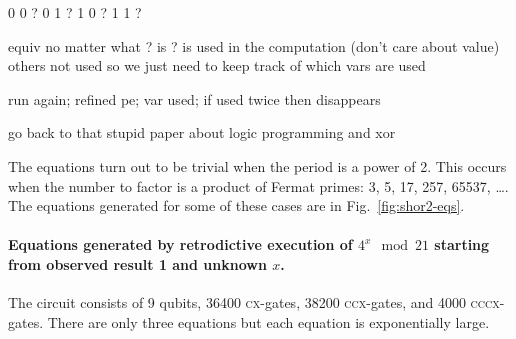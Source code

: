 \documentclass{article}
\newcommand{\cx}{\textsc{cx}}
\newcommand{\ccx}{\textsc{ccx}}
\newcommand{\cccx}{\textsc{cccx}}
\begin{document}
0 0 ?
0 1 ?
1 0 ?
1 1 ?

equiv no matter what ? is
? is used in the computation (don't care about value)
others not used
so we just need to keep track of which vars are used

run again; refined pe; var used; if used twice then disappears

go back to that stupid paper about logic programming and xor 


The equations turn out to be trivial when the period is a power of
2. This occurs when the number to factor is a product of Fermat
primes: 3, 5, 17, 257, 65537, \ldots. The equations generated for some
of these cases are in Fig.~\ref{fig:shor2-eqs}. 

\paragraph*{Equations generated by retrodictive execution of $4^x \mod{21}$ starting from observed result 1 and unknown $x$.}
The circuit consists of 9 qubits, 36400 \cx-gates, 38200 \ccx-gates,
and 4000 \cccx-gates. There are only three equations but each equation
is exponentially large. 
\end{document}

